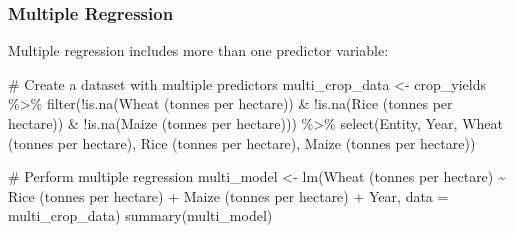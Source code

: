 \documentclass[
  letterpaper,
]{book}
\newenvironment{Shaded}{\begin{snugshade}}{\end{snugshade}}
\newcommand{\AttributeTok}[1]{\textcolor[rgb]{0.40,0.45,0.13}{#1}}
\newcommand{\CommentTok}[1]{\textcolor[rgb]{0.37,0.37,0.37}{#1}}
\newcommand{\FunctionTok}[1]{\textcolor[rgb]{0.28,0.35,0.67}{#1}}
\newcommand{\NormalTok}[1]{\textcolor[rgb]{0.00,0.23,0.31}{#1}}
\newcommand{\OtherTok}[1]{\textcolor[rgb]{0.00,0.23,0.31}{#1}}
\newcommand{\SpecialCharTok}[1]{\textcolor[rgb]{0.37,0.37,0.37}{#1}}
\newcommand{\StringTok}[1]{\textcolor[rgb]{0.13,0.47,0.30}{#1}}
\begin{document}
\subsubsection{Multiple Regression}\label{multiple-regression}

Multiple regression includes more than one predictor variable:

\begin{Shaded}
\begin{Highlighting}[]
\CommentTok{\# Create a dataset with multiple predictors}
\NormalTok{multi\_crop\_data }\OtherTok{\textless{}{-}}\NormalTok{ crop\_yields }\SpecialCharTok{\%\textgreater{}\%}
  \FunctionTok{filter}\NormalTok{(}\SpecialCharTok{!}\FunctionTok{is.na}\NormalTok{(}\StringTok{\textasciigrave{}}\AttributeTok{Wheat (tonnes per hectare)}\StringTok{\textasciigrave{}}\NormalTok{) }\SpecialCharTok{\&} \SpecialCharTok{!}\FunctionTok{is.na}\NormalTok{(}\StringTok{\textasciigrave{}}\AttributeTok{Rice (tonnes per hectare)}\StringTok{\textasciigrave{}}\NormalTok{) }\SpecialCharTok{\&} \SpecialCharTok{!}\FunctionTok{is.na}\NormalTok{(}\StringTok{\textasciigrave{}}\AttributeTok{Maize (tonnes per hectare)}\StringTok{\textasciigrave{}}\NormalTok{)) }\SpecialCharTok{\%\textgreater{}\%}
  \FunctionTok{select}\NormalTok{(Entity, Year, }\StringTok{\textasciigrave{}}\AttributeTok{Wheat (tonnes per hectare)}\StringTok{\textasciigrave{}}\NormalTok{, }\StringTok{\textasciigrave{}}\AttributeTok{Rice (tonnes per hectare)}\StringTok{\textasciigrave{}}\NormalTok{, }\StringTok{\textasciigrave{}}\AttributeTok{Maize (tonnes per hectare)}\StringTok{\textasciigrave{}}\NormalTok{)}

\CommentTok{\# Perform multiple regression}
\NormalTok{multi\_model }\OtherTok{\textless{}{-}} \FunctionTok{lm}\NormalTok{(}\StringTok{\textasciigrave{}}\AttributeTok{Wheat (tonnes per hectare)}\StringTok{\textasciigrave{}} \SpecialCharTok{\textasciitilde{}} \StringTok{\textasciigrave{}}\AttributeTok{Rice (tonnes per hectare)}\StringTok{\textasciigrave{}} \SpecialCharTok{+} \StringTok{\textasciigrave{}}\AttributeTok{Maize (tonnes per hectare)}\StringTok{\textasciigrave{}} \SpecialCharTok{+}\NormalTok{ Year, }\AttributeTok{data =}\NormalTok{ multi\_crop\_data)}
\FunctionTok{summary}\NormalTok{(multi\_model)}
\end{Highlighting}
\end{Shaded}
\end{document}

